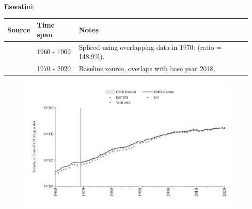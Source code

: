 \documentclass[12pt,a4paper,landscape]{article}
\begin{document}
\begin{adjustbox}{max totalsize={\paperwidth}{\paperheight},center}
\begin{minipage}[t][\textheight][t]{\textwidth}
\vspace*{0.5cm}
{}
\begin{center}
{\Large\bfseries Eswatini}
\end{center}
\vspace{0.5cm}
\begin{table}[H]
\centering
\small
\begin{tabular}{|l|l|l|}
\hline
\textbf{Source} & \textbf{Time span} & \textbf{Notes} \\
\hline
\rowcolor{white}\cite{WDI_ARC}& 1960 - 1969 &Spliced using overlapping data in 1970: (ratio = 148.9\%).\\
\rowcolor{lightgray}\cite{UN}& 1970 - 2020 &Baseline source, overlaps with base year 2018.\\
\hline
\end{tabular}
\end{table}
\begin{figure}[H]
\centering
\includegraphics[width=\textwidth,height=0.6\textheight,keepaspectratio]{graphs/SWZ_imports.pdf}
\end{figure}
\end{minipage}
\end{adjustbox}
\end{document}
